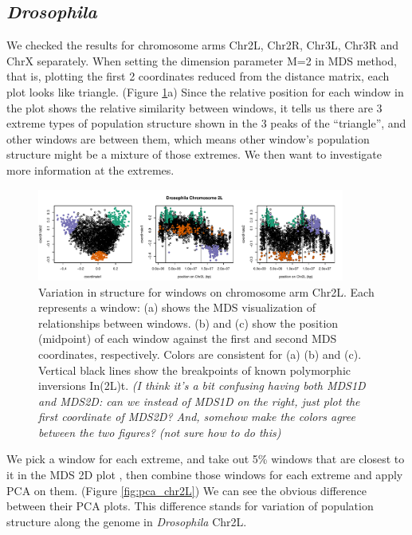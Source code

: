 \documentclass[11pt, oneside]{article}   	%
\newcommand{\plr}[1]{{\em \color{blue} #1}}
\begin{document}
\subsection{\textit{Drosophila}}
We checked the results for chromosome arms Chr2L, Chr2R, Chr3L, Chr3R and ChrX separately. When setting the dimension parameter M=2 in MDS method, that is, plotting the first 2 coordinates reduced from the distance matrix, each plot looks like triangle.
(Figure \ref{fig:mds_chr2L}a) Since the relative position for each window in the plot shows the relative similarity between windows, it tells us there are 3 extreme types of population structure shown in the 3 peaks of the ``triangle'', and other windows are between them, which means other window's population structure might be a mixture of those extremes. We then want to investigate more information at the extremes.

\begin{figure}
    \begin{center}
       \includegraphics[width=0.9\textwidth]{Fig1_Together_MDS_plot_Chr2L_final_abline}
    \end{center}
    \caption{
         Variation in structure for windows on chromosome arm Chr2L. 
         Each represents a window: (a) shows the MDS visualization of relationships between windows. 
         (b) and (c) show the position (midpoint) of each window against the first and second MDS coordinates, respectively. 
         Colors are consistent for (a) (b) and (c).
         Vertical black lines show the breakpoints of known polymorphic inversions In(2L)t.
         \plr{(I think it's a bit confusing having both MDS1D and MDS2D: can we instead of MDS1D on the right, just plot the first coordinate of MDS2D?  And, somehow make the colors agree between the two figures? (not sure how to do this)}
         \label{fig:mds_chr2L}
    }
\end{figure}


We pick a window for each extreme, and take out 5\% windows that are closest to it in the MDS 2D plot , then combine those windows for each extreme and apply PCA on them. (Figure \ref{fig:pca_chr2L}) We can see the obvious difference between their PCA plots. This difference stands for variation of population structure along the genome in \textit{Drosophila} Chr2L.
\end{document}
